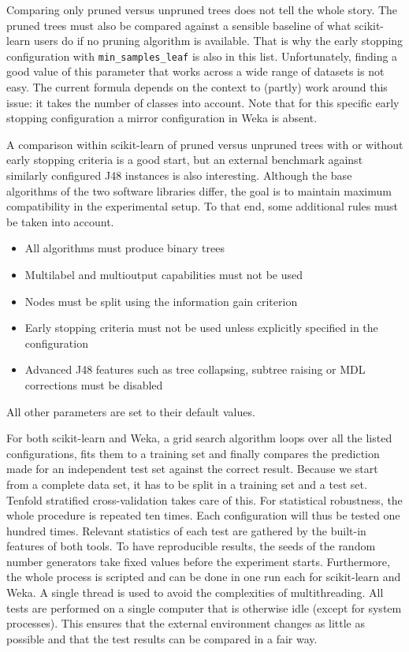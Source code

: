 Comparing only pruned versus unpruned trees does not tell the whole story. The pruned trees must also be compared against a sensible baseline of what scikit-learn users do if no pruning algorithm is available. That is why the early stopping configuration with \texttt{min\_samples\_leaf} is also in this list. Unfortunately, finding a good value of this parameter that works across a wide range of datasets is not easy. The current formula depends on the context to (partly) work around this issue: it takes the number of classes into account. Note that for this specific early stopping configuration a mirror configuration in Weka is absent.

A comparison within scikit-learn of pruned versus unpruned trees with or without early stopping criteria is a good start, but an external benchmark against similarly configured J48 instances is also interesting. Although the base algorithms of the two software libraries differ, the goal is to maintain maximum compatibility in the experimental setup. To that end, some additional rules must be taken into account.

\begin{itemize}
    \item All algorithms must produce binary trees
    \item Multilabel and multioutput capabilities must not be used
    \item Nodes must be split using the information gain criterion
    \item Early stopping criteria must not be used unless explicitly specified in the configuration
    \item Advanced J48 features such as tree collapsing, subtree raising or MDL corrections must be disabled
\end{itemize}

All other parameters are set to their default values.

For both scikit-learn and Weka, a grid search algorithm loops over all the listed configurations, fits them to a training set and finally compares the prediction made for an independent test set against the correct result. Because we start from a complete data set, it has to be split in a training set and a test set. Tenfold stratified cross-validation takes care of this. For statistical robustness, the whole procedure is repeated ten times. Each configuration will thus be tested one hundred times. Relevant statistics of each test are gathered by the built-in features of both tools. To have reproducible results, the seeds of the random number generators take fixed values before the experiment starts. Furthermore, the whole process is scripted and can be done in one run each for scikit-learn and Weka. A single thread is used to avoid the complexities of multithreading. All tests are performed on a single computer that is otherwise idle (except for system processes). This ensures that the external environment changes as little as possible and that the test results can be compared in a fair way.

